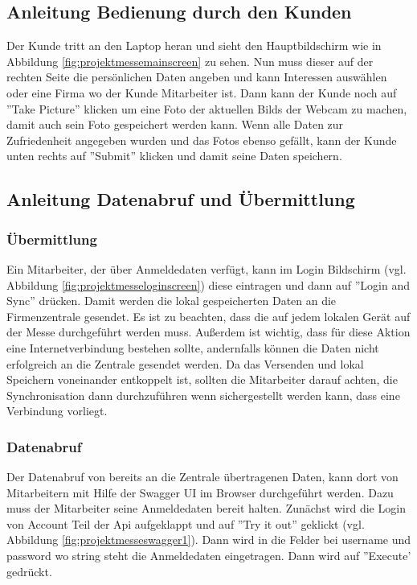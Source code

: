 \newpage
\subsection{Anleitung Bedienung durch den Kunden}
Der Kunde tritt an den Laptop heran und sieht den Hauptbildschirm wie in Abbildung \ref{fig:projektmessemainscreen} zu sehen. Nun muss dieser auf der rechten Seite die persönlichen Daten angeben und kann Interessen auswählen oder eine Firma wo der Kunde Mitarbeiter ist. Dann kann der Kunde noch auf ''Take Picture'' klicken um eine Foto der aktuellen Bilds der Webcam zu machen, damit auch sein Foto gespeichert werden kann. Wenn alle Daten zur Zufriedenheit angegeben wurden und das Fotos ebenso gefällt, kann der Kunde unten rechts auf ''Submit'' klicken und damit seine Daten speichern.

\subsection{Anleitung Datenabruf und Übermittlung}
\subsubsection{Übermittlung}
Ein Mitarbeiter, der über Anmeldedaten verfügt, kann im Login Bildschirm (vgl. Abbildung \ref{fig:projektmesseloginscreen}) diese eintragen und dann auf ''Login and Sync'' drücken. Damit werden die lokal gespeicherten Daten an die Firmenzentrale gesendet. Es ist zu beachten, dass die auf jedem lokalen Gerät auf der Messe durchgeführt werden muss. Außerdem ist wichtig, dass für diese Aktion eine Internetverbindung bestehen sollte, andernfalls können die Daten nicht erfolgreich an die Zentrale gesendet werden. Da das Versenden und lokal Speichern voneinander entkoppelt ist, sollten die Mitarbeiter darauf achten, die Synchronisation dann durchzuführen wenn sichergestellt werden kann, dass eine Verbindung vorliegt.

\subsubsection{Datenabruf}
Der Datenabruf von bereits an die Zentrale übertragenen Daten, kann dort von Mitarbeitern mit Hilfe der Swagger UI im Browser durchgeführt werden. Dazu muss der Mitarbeiter seine Anmeldedaten bereit halten. Zunächst wird die Login von Account Teil der Api aufgeklappt und auf ''Try it out'' geklickt (vgl. Abbildung \ref{fig:projektmesseswagger1}). Dann wird in die Felder bei username und password wo string steht die Anmeldedaten eingetragen. Dann wird auf ''Execute' gedrückt. 

